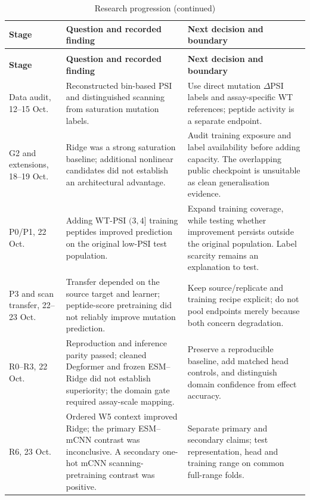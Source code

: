 \begingroup
\small{}
\begin{longtable}{|P{2.0cm}|P{5.8cm}|P{\dimexpr\textwidth-7.8cm-6\arrayrulewidth\relax}|}
\caption[Research progression: the question resolved and the decision it motivated]{Research progression: the question resolved and the decision it motivated}
\label{tab:research-progress-history}\\
\hline
\textbf{Stage} & \textbf{Question and recorded finding} & \textbf{Next decision and boundary} \\ \hline
\endfirsthead
\caption[]{Research progression (continued)}\\
\hline
\textbf{Stage} & \textbf{Question and recorded finding} & \textbf{Next decision and boundary} \\ \hline
\endhead
Data audit, 12--15 Oct. & Reconstructed bin-based PSI and distinguished scanning from saturation mutation labels. & Use direct mutation $\Delta$PSI labels and assay-specific WT references; peptide activity is a separate endpoint. \\ \hline
G2 and extensions, 18--19 Oct. & Ridge was a strong saturation baseline; additional nonlinear candidates did not establish an architectural advantage. & Audit training exposure and label availability before adding capacity. The overlapping public checkpoint is unsuitable as clean generalisation evidence. \\ \hline
P0/P1, 22 Oct. & Adding WT-PSI $(3,4]$ training peptides improved prediction on the original low-PSI test population. & Expand training coverage, while testing whether improvement persists outside the original population. Label scarcity remains an explanation to test. \\ \hline
P3 and scan transfer, 22--23 Oct. & Transfer depended on the source target and learner; peptide-score pretraining did not reliably improve mutation prediction. & Keep source/replicate and training recipe explicit; do not pool endpoints merely because both concern degradation. \\ \hline
R0--R3, 22 Oct. & Reproduction and inference parity passed; cleaned Degformer and frozen ESM--Ridge did not establish superiority; the domain gate required assay-scale mapping. & Preserve a reproducible baseline, add matched head controls, and distinguish domain confidence from effect accuracy. \\ \hline
R6, 23 Oct. & Ordered W5 context improved Ridge; the primary ESM--mCNN contrast was inconclusive. A secondary one-hot mCNN scanning-pretraining contrast was positive. & Separate primary and secondary claims; test representation, head and training range on common full-range folds. \\ \hline

\end{longtable}
